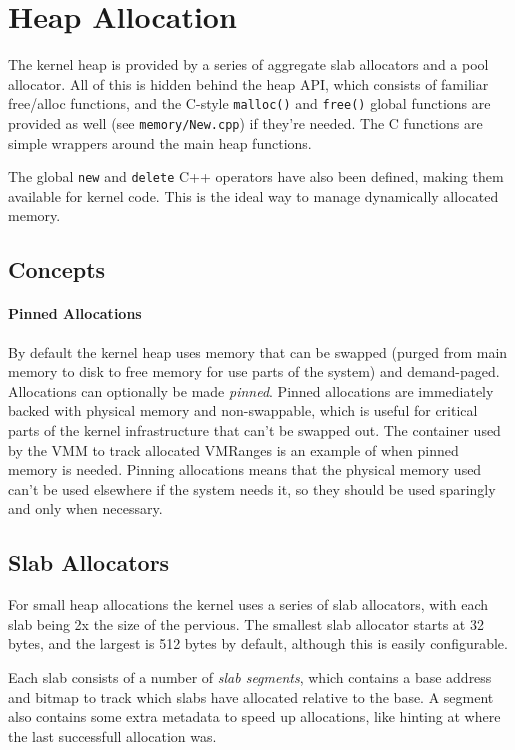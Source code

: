 \section{Heap Allocation}
The kernel heap is provided by a series of aggregate slab allocators and a pool allocator. All of this is hidden behind the heap API, which consists of familiar free/alloc functions, and the C-style \verb|malloc()| and \verb|free()| global functions are provided as well (see \verb|memory/New.cpp|) if they're needed. The C functions are simple wrappers around the main heap functions.

The global \verb|new| and \verb|delete| C++ operators have also been defined, making them available for kernel code. This is the ideal way to manage dynamically allocated memory.

\subsection{Concepts}

\paragraph{Pinned Allocations} By default the kernel heap uses memory that can be swapped (purged from main memory to disk to free memory for use parts of the system) and demand-paged. Allocations can optionally be made \textit{pinned}. Pinned allocations are immediately backed with physical memory and non-swappable, which is useful for critical parts of the kernel infrastructure that can't be swapped out. The container used by the VMM to track allocated VMRanges is an example of when pinned memory is needed. Pinning allocations means that the physical memory used can't be used elsewhere if the system needs it, so they should be used sparingly and only when necessary.

\subsection{Slab Allocators}
For small heap allocations the kernel uses a series of slab allocators, with each slab being 2x the size of the pervious. The smallest slab allocator starts at 32 bytes, and the largest is 512 bytes by default, although this is easily configurable. 

Each slab consists of a number of \textit{slab segments}, which contains a base address and bitmap to track which slabs have allocated relative to the base. A segment also contains some extra metadata to speed up allocations, like hinting at where the last successfull allocation was.


